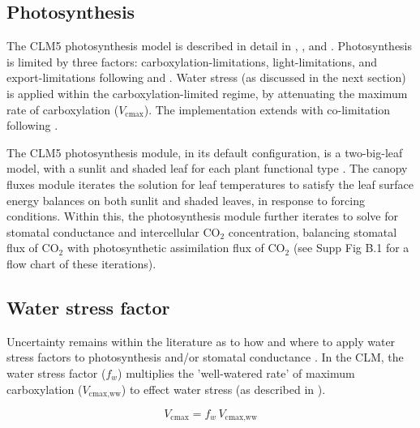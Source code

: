 \documentclass[draft,linenumbers]{agujournal}
\begin{document}
\subsection{Photosynthesis}
\label{sect:A}
    The CLM5 photosynthesis model is described in detail in \citet{bonan2011}, \citet{thornton2007},
    and \citet{oleson2013}. Photosynthesis is limited by three factors: carboxylation-limitations, light-limitations, and export-limitations 
    following \citet{farquhar1980} and \citet{harley1992}. Water stress (as discussed in the next section) is applied within the carboxylation-limited regime, by attenuating the maximum rate of carboxylation ($V_{\text{cmax}}$). The implementation extends \citet{sellers1996a,sellers1996b} with 
    co-limitation following \citet{collatz1991}. 
    
    The CLM5 photosynthesis module, in its default configuration, is a two-big-leaf model, with a sunlit and shaded leaf for each plant functional type \citep{thornton2007, dai2004, oleson2013}. 
    The canopy fluxes module iterates the solution for leaf temperatures to satisfy the leaf surface energy balances on both sunlit and shaded leaves, in response to forcing conditions.
    Within this, the photosynthesis module further iterates to solve for stomatal conductance and intercellular CO$_2$ concentration, balancing stomatal flux of CO$_2$ with photosynthetic assimilation flux of CO$_2$ (see Supp Fig B.1 for a flow chart of these iterations).


\subsection{Water stress factor}
\label{sect:wsf}
     Uncertainty remains within the literature as to how and where to apply water stress factors to photosynthesis and/or stomatal conductance 
    \citep{zhou2013,novick2016a,sperry2015}.
    In the CLM, the water stress factor ($f_w$) multiplies the 'well-watered rate' of maximum carboxylation ($V_{\text{cmax,ww}}$) to effect water stress (as described in \citet{oleson2013}). 
    
    \begin{equation}
    V_{\text{cmax}} = f_w\, V_{\text{cmax,ww}} 
    \end{equation}
\end{document}
